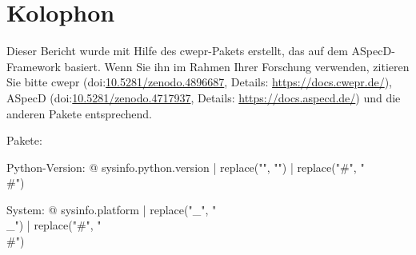\section*{Kolophon}

Dieser Bericht wurde mit Hilfe des cwepr-Pakets erstellt, das auf dem ASpecD-Framework basiert. Wenn Sie ihn im Rahmen Ihrer Forschung verwenden, zitieren Sie bitte cwepr (doi:\href{https://doi.org/10.5281/zenodo.4896687}{10.5281/zenodo.4896687}, Details: \url{https://docs.cwepr.de/}), ASpecD (doi:\href{https://doi.org/10.5281/zenodo.4717937}{10.5281/zenodo.4717937}, Details: \url{https://docs.aspecd.de/}) und die anderen Pakete entsprechend.

Pakete: %


Python-Version: {@ sysinfo.python.version | replace("\n", "") | replace("#", "\\#") }

System: {@ sysinfo.platform | replace("_", "\\_") | replace("#", "\\#") }
